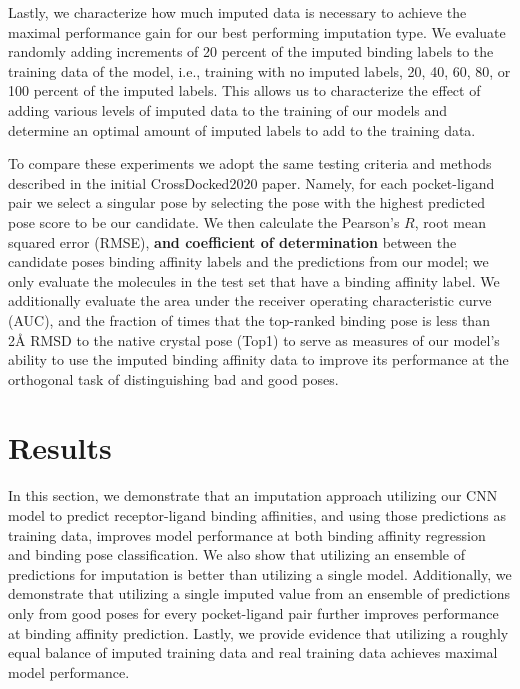 \documentclass[journal=jcim,manuscript=article]{achemso}
\begin{document}
Lastly, we characterize how much imputed data is necessary to achieve the maximal performance gain for our best performing imputation type.
We evaluate randomly adding increments of 20 percent of the imputed binding labels to the training data of the model, i.e., training with no imputed labels, 20, 40, 60, 80, or 100 percent of the imputed labels.
This allows us to characterize the effect of adding various levels of imputed data to the training of our models and determine an optimal amount of imputed labels to add to the training data.

To compare these experiments we adopt the same testing criteria and methods described in the initial CrossDocked2020 paper\cite{crossdocked2020}.
Namely, for each pocket-ligand pair we select a singular pose by selecting the pose with the highest predicted pose score to be our candidate. 
We then calculate the Pearson's $R$, root mean squared error (RMSE),\textbf{ and coefficient of determination }between the candidate poses binding affinity labels and the predictions from our model; we only evaluate the molecules in the test set that have a binding affinity label.
We additionally evaluate the area under the receiver operating characteristic curve (AUC), and the fraction of times that the top-ranked binding pose is less than 2{\AA} RMSD to the native crystal pose (Top1) to serve as measures of our model's ability to use the imputed binding affinity data to improve its performance at the orthogonal task of distinguishing bad and good poses.

\section{Results}
In this section, we demonstrate that an imputation approach utilizing our CNN model to predict receptor-ligand binding affinities, and using those predictions as training data, improves model performance at both binding affinity regression and binding pose classification.
We also show that utilizing an ensemble of predictions for imputation is better than utilizing a single model.
Additionally, we demonstrate that utilizing a single imputed value from an ensemble of predictions only from good poses for every pocket-ligand pair further improves performance at binding affinity prediction.
Lastly, we provide evidence that utilizing a roughly equal balance of imputed training data and real training data achieves maximal model performance.
\end{document}
